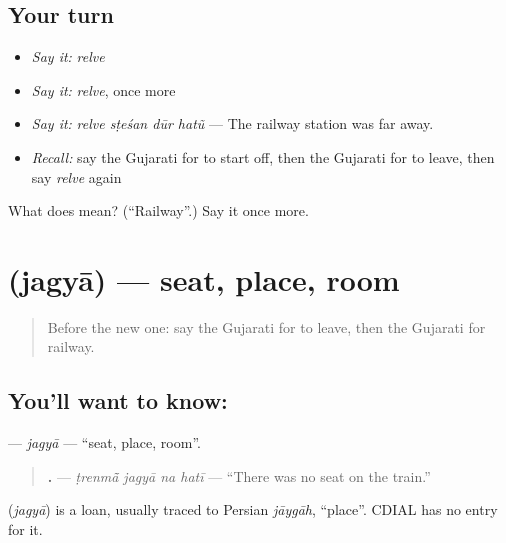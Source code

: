 \subsection*{Your turn}
\begin{itemize}
\raggedright
  \item \emph{Say it:} \emph{relve}
  \item \emph{Say it:} \emph{relve}, once more
  \item \emph{Say it:} \emph{relve sṭeśan dūr hatũ} — The railway station was far away.
  \item \emph{Recall:} say the Gujarati for to start off, then the Gujarati for to leave, then say \emph{relve} again
\end{itemize}

\begin{tcolorbox}[breakable,colback=teal!4,colframe=teal!35!black,title={Before you move on}]
What does  mean? (\textquotedblleft{}Railway\textquotedblright{}.) Say it once more.
\end{tcolorbox}
\section[\texorpdfstring{\gu{જગ્યા} (jagyā)}{જગ્યા (jagyā)}]{ (jagyā) — seat, place, room}

\label{lesson:GU-C205-jagya}



\begin{quote}
Before the new one: say the Gujarati for to leave, then the Gujarati for railway.
\end{quote}

\subsection*{You'll want to know: }
\textbf{} — \emph{jagyā} — \textquotedblleft{}seat, place, room\textquotedblright{}.

\begin{quote}
\textbf{   .} — \emph{ṭrenmā̃ jagyā na hatī} — \textquotedblleft{}There was no seat on the train.\textquotedblright{}
\end{quote}

\begin{cousinweb}
\textbf{} (\emph{jagyā}) is a loan, usually traced to Persian \emph{jāygāh}, \textquotedblleft{}place\textquotedblright{}. CDIAL has no entry for it.
\end{cousinweb}

